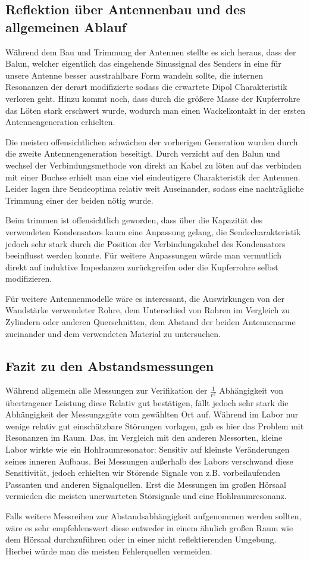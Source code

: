 \documentclass[titlepage,11pt,a4paper,ngerman]{article}
\begin{document}
\subsection{Reflektion über Antennenbau und des allgemeinen Ablauf}
Während dem Bau und Trimmung der Antennen stellte es sich heraus, dass der Balun, welcher eigentlich das eingehende Sinussignal des Senders in eine für unsere Antenne besser ausstrahlbare Form wandeln sollte, die internen Resonanzen der derart modifizierte sodass die erwartete Dipol Charakteristik verloren geht. Hinzu kommt noch, dass durch die größere Masse der Kupferrohre das Löten stark erschwert wurde, wodurch man einen Wackelkontakt in der ersten Antennengeneration erhielten. \par
Die meisten offensichtlichen schwächen der vorherigen Generation wurden durch die zweite Antennengeneration beseitigt. Durch verzicht auf den Balun und wechsel der Verbindungsmethode von direkt an Kabel zu löten auf das verbinden mit einer Buchse erhielt man eine viel eindeutigere Charakteristik der Antennen. Leider lagen ihre Sendeoptima relativ weit Auseinander, sodass eine nachträgliche Trimmung einer der beiden nötig wurde.\par
Beim trimmen ist offensichtlich geworden, dass über die Kapazität des verwendeten Kondensators kaum eine Anpassung gelang, die Sendecharakteristik jedoch sehr stark durch die Position der Verbindungskabel des Kondensators beeinflusst werden konnte. Für weitere Anpassungen würde man vermutlich direkt auf induktive Impedanzen zurückgreifen oder die Kupferrohre selbst modifizieren. \par
Für weitere Antennenmodelle wäre es interessant, die Auswirkungen von der Wandstärke verwendeter Rohre, dem Unterschied von Rohren im Vergleich zu Zylindern oder anderen Querschnitten, dem Abstand der beiden Antennenarme zueinander und dem verwendeten Material zu untersuchen.

\subsection{Fazit zu den Abstandsmessungen}
Während allgemein alle Messungen zur Verifikation der $\frac{1}{r^2}$ Abhängigkeit von übertragener Leistung diese Relativ gut bestätigen, fällt jedoch sehr stark die Abhängigkeit der Messungsgüte vom gewählten Ort auf. Während im Labor nur wenige relativ gut einschätzbare Störungen vorlagen, gab es hier das Problem mit Resonanzen im Raum. Das, im Vergleich mit den anderen Messorten, kleine Labor wirkte wie ein Hohlraumresonator: Sensitiv auf kleinste Veränderungen seines inneren Aufbaus. Bei Messungen außerhalb des Labors verschwand diese Sensitivität, jedoch erhielten wir Störende Signale von z.B. vorbeilaufenden Passanten und anderen Signalquellen. Erst die Messungen im großen Hörsaal vermieden die meisten unerwarteten Störsignale und eine Hohlraumresonanz.\par
Falls weitere Messreihen zur Abstandsabhängigkeit aufgenommen werden sollten, wäre es sehr empfehlenswert diese entweder in einem ähnlich großen Raum wie dem Hörsaal durchzuführen oder in einer nicht reflektierenden Umgebung. Hierbei würde man die meisten Fehlerquellen vermeiden.
\end{document}
